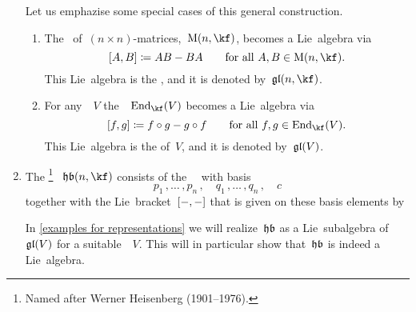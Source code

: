 \begin{examples}
\begin{enumerate}
			Let us emphazise some special cases of this general construction.
			\begin{enumerate}
				\item
					The~{\algebra{$\kf$}} of~$(n \times n)$-matrices,~$\Mat(n, \kf)$, becomes a Lie~algebra via
					\[
						[A,B]
						\defined
						AB - BA
						\qquad
						\text{for all~$A, B \in \Mat(n, \kf)$.}
					\]
					This Lie~algebra is the , and it is denoted by~$\gllie(n, \kf)$.
				\item
					For any~{\vectorspace{$\kf$}}~$V$ the~{\algebra{$\kf$}}~$\End_{\kf}(V)$ becomes a Lie~algebra via
					\[
						[f, g]
						\defined
						f \circ g - g \circ f
						\qquad
						\text{for all~$f, g \in \End_{\kf}(V)$.}
					\]
					This Lie~algebra is the  of~$V$, and it is denoted by~$\mathfrak{gl}(V)$.
			\end{enumerate}
		\item
			The %
			\footnote{
				Named after Werner Heisenberg (1901--1976).
			}%
			~$\heisenberglie(n, \kf)$ consists of the~~{\vectorspace{$\kf$}} with basis
			\[
				p_1 \,, \dotsc \,, p_n \,,
				\quad
				q_1 \,, \dotsc \,, q_n \,,
				\quad
				c
				\label{heisenberg basis}
			\]
			together with the Lie~bracket~$[-, -]$ that is given on these basis elements by
			In \cref{examples for representations} we will realize~$\mathfrak{hb}$ as a Lie~subalgebra of~$\mathfrak{gl}(V)$ for a suitable~\vectorspace{$\kf$}~$V$.
			This will in particular show that~$\mathfrak{hb}$ is indeed a Lie~algebra.
	\end{enumerate}
\end{examples}


